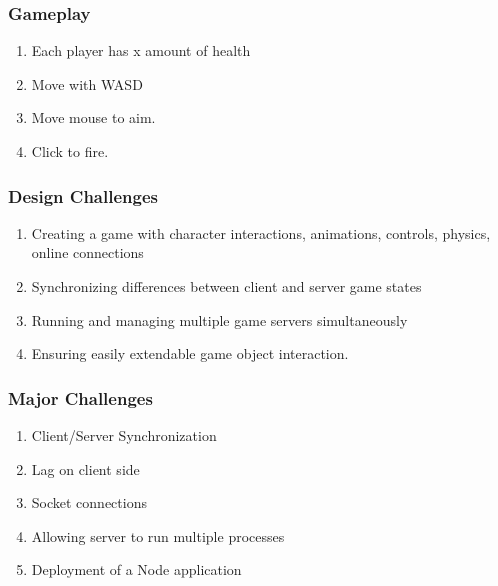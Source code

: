 \documentclass{beamer}
\begin{document}
\begin{frame}
\frametitle{Gameplay}
\begin{enumerate}
  \item Each player has x amount of health
  \item Move with WASD
  \item Move mouse to aim.
  \item Click to fire.
\end{enumerate}
\end{frame}


\begin{frame}
\frametitle{Design Challenges}
\begin{enumerate}
  \item Creating a game with character interactions, animations, controls, physics, online connections
  \item Synchronizing differences between client and server game states
  \item Running and managing multiple game servers simultaneously
  \item Ensuring easily extendable game object interaction. 
\end{enumerate}
\end{frame}


\begin{frame}
\frametitle{Major Challenges}
\begin{enumerate}
  \item Client/Server Synchronization
\item Lag on client side
\item Socket connections
\item Allowing server to run multiple processes
\item Deployment of a Node application
\end{enumerate}
\end{frame}
\end{document}
